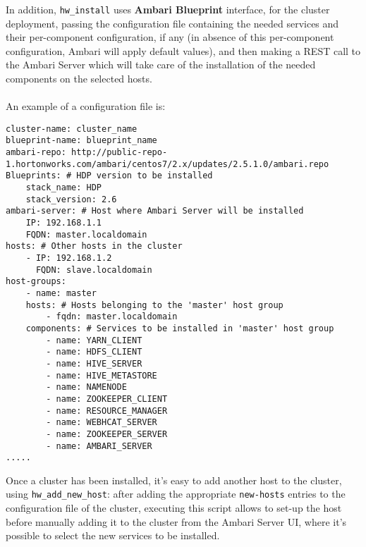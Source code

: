 In addition, \texttt{hw\_install} uses \textbf{Ambari Blueprint} interface, for the cluster deployment, passing the configuration file containing the needed services and their per-component configuration, if any (in absence of this per-component configuration, Ambari will apply default values), and then making a REST call to the Ambari Server which will take care of the installation of the needed components on the selected hosts.
\\\\
An example of a configuration file is:

\begin{verbatim}
cluster-name: cluster_name
blueprint-name: blueprint_name
ambari-repo: http://public-repo-1.hortonworks.com/ambari/centos7/2.x/updates/2.5.1.0/ambari.repo
Blueprints: # HDP version to be installed
    stack_name: HDP
    stack_version: 2.6
ambari-server: # Host where Ambari Server will be installed
    IP: 192.168.1.1
    FQDN: master.localdomain
hosts: # Other hosts in the cluster
    - IP: 192.168.1.2
      FQDN: slave.localdomain
host-groups:
    - name: master
    hosts: # Hosts belonging to the 'master' host group
        - fqdn: master.localdomain
    components: # Services to be installed in 'master' host group
        - name: YARN_CLIENT
        - name: HDFS_CLIENT
        - name: HIVE_SERVER
        - name: HIVE_METASTORE
        - name: NAMENODE
        - name: ZOOKEEPER_CLIENT
        - name: RESOURCE_MANAGER
        - name: WEBHCAT_SERVER
        - name: ZOOKEEPER_SERVER
        - name: AMBARI_SERVER
.....
\end{verbatim}

Once a cluster has been installed, it's easy to add another host to the cluster, using \texttt{hw\_add\_new\_host}: after adding the appropriate \texttt{new-hosts} entries to the configuration file of the cluster, executing this script allows to set-up the host before manually adding it to the cluster from the Ambari Server UI, where it's possible to select the new services to be installed.
